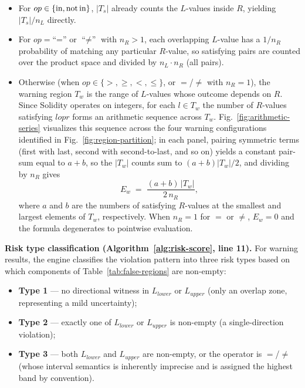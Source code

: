 \documentclass[pdflatex,sn-basic]{sn-jnl}%
\theoremstyle{thmstyleone}%
\theoremstyle{thmstyletwo}%
\theoremstyle{thmstylethree}%
\begin{document}
\begin{itemize}
\item For $op \in \{\text{in}, \text{not\,in}\}$, $|T_s|$ already counts the $L$-values inside $R$, yielding $|T_s|/n_L$ directly.
\item For $op = \text{``=''}$ or $\text{``$\neq$''}$ with $n_R > 1$, each overlapping $L$-value has a $1/n_R$ probability of matching any particular $R$-value, so satisfying pairs are counted over the product space and divided by $n_L \cdot n_R$ (all pairs).
\item Otherwise (when $op \in \{>, \geq, <, \leq\}$, or $=$/$\neq$ with $n_R = 1$), the warning region $T_w$ is the range of $L$-values whose outcome depends on $R$.
Since Solidity operates on integers, for each $l \in T_w$ the number of $R$-values satisfying $l \mathrel{op} r$ forms an arithmetic sequence across $T_w$. Fig.~\ref{fig:arithmetic-series} visualizes this sequence across the four warning configurations identified in Fig.~\ref{fig:region-partition}; in each panel, pairing symmetric terms (first with last, second with second-to-last, and so on) yields a constant pair-sum equal to $a + b$, so the $|T_w|$ counts sum to $(a+b)|T_w|/2$, and dividing by $n_R$ gives
\[
E_w \;=\; \frac{(a + b) \, |T_w|}{2 \, n_R},
\]
where $a$ and $b$ are the numbers of satisfying $R$-values at the smallest and largest elements of $T_w$, respectively.
When $n_R = 1$ for $=$ or $\neq$, $E_w = 0$ and the formula degenerates to pointwise evaluation.
\end{itemize}

\smallskip
\textbf{Risk type classification (Algorithm~\ref{alg:risk-score}, line 11).}
For warning results, the engine classifies the violation pattern into three risk types based on which components of Table~\ref{tab:false-regions} are non-empty:
\begin{itemize}
    \item \textbf{Type 1} --- no directional witness in $L_{\mathit{lower}}$ or $L_{\mathit{upper}}$ (only an overlap zone, representing a mild uncertainty);
    \item \textbf{Type 2} --- exactly one of $L_{\mathit{lower}}$ or $L_{\mathit{upper}}$ is non-empty (a single-direction violation);
    \item \textbf{Type 3} --- both $L_{\mathit{lower}}$ and $L_{\mathit{upper}}$ are non-empty, or the operator is $=$/$\neq$ (whose interval semantics is inherently imprecise and is assigned the highest band by convention).
\end{itemize}
\end{document}
